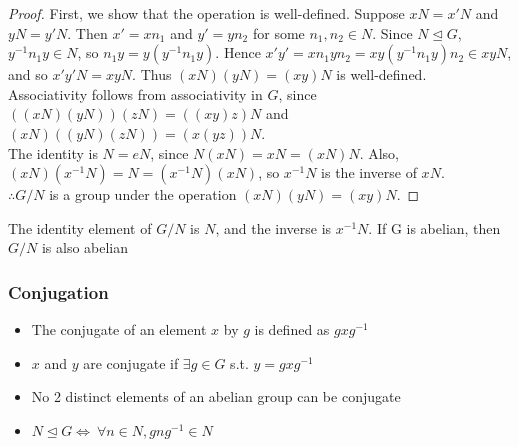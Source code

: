 \documentclass[../Odyssey_Project.tex]{subfiles}
\begin{document}
\begin{proof}
    First, we show that the operation is well-defined. Suppose \(xN = x'N\) and \(yN = y'N\). Then \(x' = xn_1\) and \(y' = yn_2\) for some \(n_1,n_2 \in N\). Since \(N \trianglelefteq G\), \(y^{-1}n_1y \in N\), so \(n_1y = y(y^{-1}n_1y)\). Hence \(x'y' = xn_1yn_2 = xy(y^{-1}n_1y)n_2 \in xyN\), and so \(x'y'N = xyN\). Thus \((xN)(yN) = (xy)N\) is well-defined. \\
    Associativity follows from associativity in \(G\), since \(((xN)(yN))(zN) = ((xy)z)N\) and \((xN)((yN)(zN)) = (x(yz))N\). \\
    The identity is \(N = eN\), since \(N(xN) = xN = (xN)N\). Also, \((xN)(x^{-1}N) = N = (x^{-1}N)(xN)\), so \(x^{-1}N\) is the inverse of \(xN\). \\
    \(\therefore G/N\) is a group under the operation \((xN)(yN) = (xy)N\).
\end{proof}
\smallskip
\noindent The identity element of \(G/N\) is \(N\), and the inverse is \(x^{-1}N\). If G is abelian, then \(G/N\) is also abelian
\subsubsection*{Conjugation}
\begin{itemize}
    \item The conjugate of an element \(x\) by \(g\) is defined as \(gxg^{-1}\)
    \item \(x\) and \(y\) are conjugate if \(\exists g \in G\) s.t. \(y = gxg^{-1}\)
    \item No 2 distinct elements of an abelian group can be conjugate
    \item \(N \trianglelefteq G \iff \ \forall n \in N, gng^{-1} \in N\)
\end{itemize}
\end{document}
